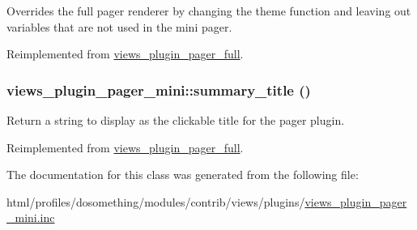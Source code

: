 Overrides the full pager renderer by changing the theme function and leaving out variables that are not used in the mini pager. 

Reimplemented from \hyperlink{classviews__plugin__pager__full_a1832939d6ea8c80e643cb94bae96daf8}{views\_\-plugin\_\-pager\_\-full}.\hypertarget{classviews__plugin__pager__mini_af95c2913ea9b9db423fb0761e543ea09}{
\subsubsection[{summary\_\-title}]{\setlength{\rightskip}{0pt plus 5cm}views\_\-plugin\_\-pager\_\-mini::summary\_\-title ()}}
\label{classviews__plugin__pager__mini_af95c2913ea9b9db423fb0761e543ea09}
Return a string to display as the clickable title for the pager plugin. 

Reimplemented from \hyperlink{classviews__plugin__pager__full_af727d597c4029f7f11721871f7b9c839}{views\_\-plugin\_\-pager\_\-full}.

The documentation for this class was generated from the following file:\begin{DoxyCompactItemize}
\item 
html/profiles/dosomething/modules/contrib/views/plugins/\hyperlink{views__plugin__pager__mini_8inc}{views\_\-plugin\_\-pager\_\-mini.inc}\end{DoxyCompactItemize}
